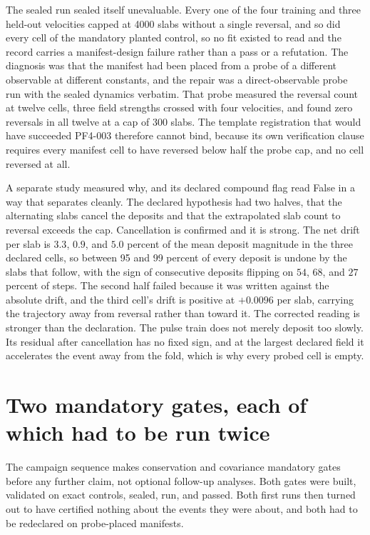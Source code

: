 \documentclass[aps,pre,reprint,nofootinbib,floatfix]{revtex4-2}
\begin{document}
The sealed run sealed itself unevaluable.  Every one of the four
training and three held-out velocities capped at 4000 slabs without a
single reversal, and so did every cell of the mandatory planted
control, so no fit existed to read and the record carries a
manifest-design failure rather than a pass or a refutation.  The
diagnosis was that the manifest had been placed from a probe of a
different observable at different constants, and the repair was a
direct-observable probe run with the sealed dynamics verbatim.  That
probe measured the reversal count at twelve cells, three field
strengths crossed with four velocities, and found zero reversals in all
twelve at a cap of 300 slabs.  The template registration that would
have succeeded PF4-003 therefore cannot bind, because its own
verification clause requires every manifest cell to have reversed below
half the probe cap, and no cell reversed at all.

A separate study measured why, and its declared compound flag read
False in a way that separates cleanly.  The declared hypothesis had two
halves, that the alternating slabs cancel the deposits and that the
extrapolated slab count to reversal exceeds the cap.  Cancellation is
confirmed and it is strong.  The net drift per slab is $3.3$, $0.9$,
and $5.0$ percent of the mean deposit magnitude in the three declared
cells, so between 95 and 99 percent of every deposit is undone by the
slabs that follow, with the sign of consecutive deposits flipping on
$54$, $68$, and $27$ percent of steps.  The second half failed because
it was written against the absolute drift, and the third cell's drift
is positive at $+0.0096$ per slab, carrying the trajectory away from
reversal rather than toward it.  The corrected reading is stronger than
the declaration.  The pulse train does not merely deposit too slowly.
Its residual after cancellation has no fixed sign, and at the largest
declared field it accelerates the event away from the fold, which is
why every probed cell is empty.

\section{Two mandatory gates, each of which had to be run twice}
\label{sec:gates}

The campaign sequence makes conservation and covariance mandatory gates
before any further claim, not optional follow-up analyses.  Both gates
were built, validated on exact controls, sealed, run, and passed.  Both
first runs then turned out to have certified nothing about the events
they were about, and both had to be redeclared on probe-placed
manifests.
\end{document}
